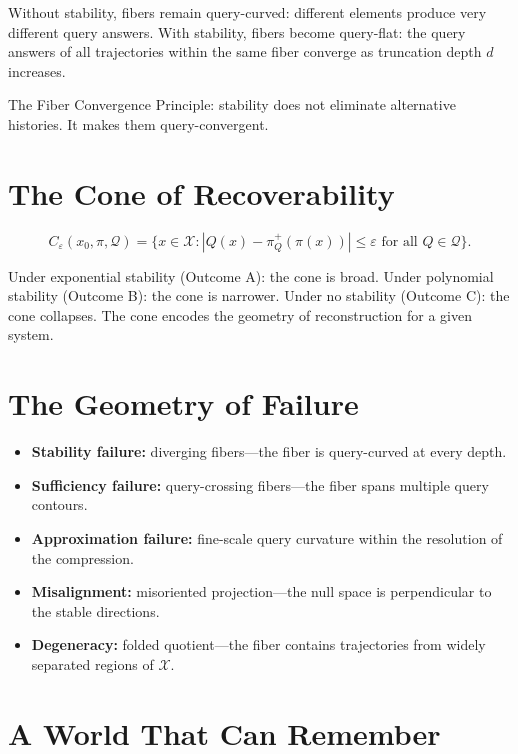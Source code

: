 Without stability, fibers remain query-curved: different elements produce very different query answers. With stability, fibers become query-flat: the query answers of all trajectories within the same fiber converge as truncation depth $d$ increases.

The Fiber Convergence Principle: stability does not eliminate alternative histories. It makes them query-convergent.

\section{The Cone of Recoverability}

\begin{definition}
\[
  C_\varepsilon(x_0, \pi, \mathcal{Q}) = \{x \in \mathcal{X} : |Q(x) - \pi^+_Q(\pi(x))| \leq \varepsilon \text{ for all } Q \in \mathcal{Q}\}.
\]
\end{definition}

Under exponential stability (Outcome A): the cone is broad. Under polynomial stability (Outcome B): the cone is narrower. Under no stability (Outcome C): the cone collapses. The cone encodes the geometry of reconstruction for a given system.

\section{The Geometry of Failure}

\begin{itemize}
  \item \textbf{Stability failure:} diverging fibers---the fiber is query-curved at every depth.
  \item \textbf{Sufficiency failure:} query-crossing fibers---the fiber spans multiple query contours.
  \item \textbf{Approximation failure:} fine-scale query curvature within the resolution of the compression.
  \item \textbf{Misalignment:} misoriented projection---the null space is perpendicular to the stable directions.
  \item \textbf{Degeneracy:} folded quotient---the fiber contains trajectories from widely separated regions of $\mathcal{X}$.
\end{itemize}

\section{A World That Can Remember}

